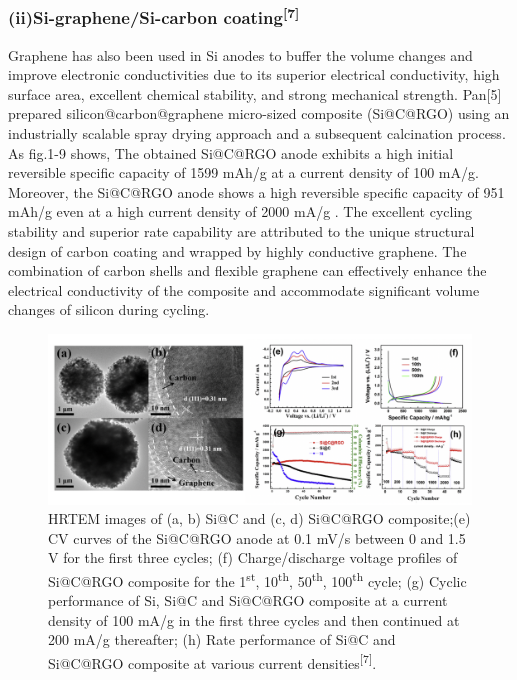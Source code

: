 \subsubsection{(ii)Si-graphene/Si-carbon coating\textsuperscript{[7]}}
Graphene has also been used in Si anodes to buffer the volume changes and improve electronic conductivities due to its superior electrical conductivity, high surface area, excellent chemical stability, and strong mechanical strength. Pan[5] prepared silicon@carbon@graphene micro-sized composite (Si@C@RGO) using an industrially scalable spray drying approach and a subsequent calcination process. As fig.1-9 shows, The obtained Si@C@RGO anode exhibits a high initial reversible speciﬁc capacity of 1599 mAh/g at a current density of 100 mA/g. Moreover, the Si@C@RGO anode shows a high reversible speciﬁc capacity of 951 mAh/g  even at a high current density of 2000 mA/g . The excellent cycling stability and superior rate capability are attributed to the unique structural design of carbon coating and wrapped by highly conductive graphene. The combination of carbon shells and ﬂexible graphene can effectively enhance the electrical conductivity of the composite and accommodate signiﬁcant volume changes of silicon during cycling.
\begin{figure}[H]%
\centering
\includegraphics[width=14cm]{src/fig/fig8.png}
\caption{HRTEM images of (a, b) Si@C and (c, d) Si@C@RGO
composite;(e) CV curves of the Si@C@RGO anode at 0.1 mV/s  between 0 and 1.5 V for the ﬁrst three cycles; (f) Charge/discharge voltage proﬁles of Si@C@RGO composite for the 1\textsuperscript{st}, 10\textsuperscript{th}, 50\textsuperscript{th}, 100\textsuperscript{th} cycle; (g) Cyclic performance of Si, Si@C and Si@C@RGO composite at a current density of 100 mA/g in the ﬁrst three cycles and then continued at 200 mA/g thereafter; (h) Rate performance of Si@C and Si@C@RGO composite at various current densities\textsuperscript{[7]}.}
\end{figure}

